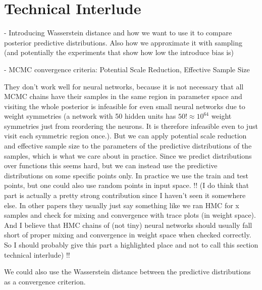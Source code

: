 \documentclass[../thesis.tex]{subfiles}
\begin{document}
\bigskip

\section{Technical Interlude}
- Introducing Wasserstein distance and how we want to use it to compare posterior predictive distributions. Also how we approximate it with sampling (and potentially the experiments that show how low the introduce bias is)

- MCMC convergence criteria:
Potential Scale Reduction, Effective Sample Size

They don't work well for neural networks, because it is not necessary that all MCMC chains have their samples in the same region in parameter space and visiting the whole posterior is infeasible for even small neural networks due to weight symmetries (a network with 50 hidden units has $50!\approx 10^64$ weight symmetries just from reordering the neurons. It is therefore infeasible even to just visit each symmetric region once.). But we can apply potential scale reduction and effective sample size to the parameters of the predictive distributions of the samples, which is what we care about in practice. Since we predict distributions over functions this seems hard, but we can instead use the predictive distributions on some specific points only. In practice we use the train and test points, but one could also use random points in input space. !! (I do think that part is actually a pretty strong contribution since I haven't seen it somewhere else. In other papers they usually just say something like we ran HMC for x samples and check for mixing and convergence with trace plots (in weight space). And I believe that HMC chains of (not tiny) neural networks should usually fall short of proper mixing and convergence in weight space when checked correctly. So I should probably give this part a highlighted place and not to call this section technical interlude) !! 

We could also use the Wasserstein distance between the predictive distributions as a convergence criterion.
\end{document}
